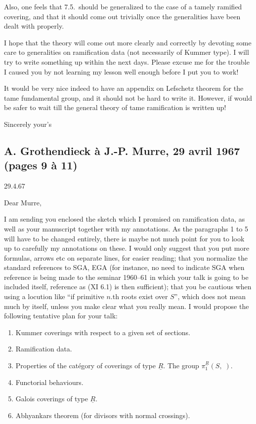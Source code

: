 \documentclass[11pt,a4paper]{article}
\begin{document}
Also, one feels that 7.5.\ should be generalized to the case of a tamely
ramified covering, and that it should come out trivially once the generalities
have been dealt with properly.

I hope that the theory will come out more clearly and correctly by devoting
some care to generalities on ramification data (not necessarily of Kummer
type). I will try to write something up within the next days. Please excuse me
for the trouble I caused you by not learning my lesson well enough before I put
you to work!

It would be very nice indeed to have an appendix on Lefschetz theorem for the
tame fundamental group, and it should not be hard to write it. However, if
would be safer to wait till the general theory of tame ramification is written
up!

Sincerely your's

\subsection*{A. Grothendieck à J.-P. Murre, 29 avril 1967 (pages 9 à 11)}

29.4.67

Dear Murre,

I am sending you enclosed the sketch which I promised on ramification data, as
well as your manuscript together with my annotations. As the paragraphs 1 to 5
will have to be changed entirely, there is maybe not much point for you to look
up to carefully my annotations on these. I would only suggest that you put more
formulas, arrows etc on  separate lines, for easier reading;
that you normalize the standard references to SGA, EGA (for instance, no need
to indicate SGA when reference is being made to the seminar 1960--61 in which
your talk is going to be included itself, reference as (XI 6.1) is then
sufficient); that you be cautious when using a locution like ``if primitive
$n$.th roots exist over $S$'', which does not mean much by itself, unless you
make clear what you really mean. I would propose the following tentative plan
for your talk:

\begin{enumerate}
  \item Kummer coverings with respect to a given set of sections.
  \item Ramification data.
  \item Properties of the catégory of coverings of type $\underline{R}$. The
    group $\pi_1^{\underline{R}}(S,\;)$.
  \item Functorial behaviours.
  \item Galois coverings of type $\underline{R}$.
  \item Abhyankars theorem (for divisors with normal crossings).
\end{enumerate}
\end{document}

